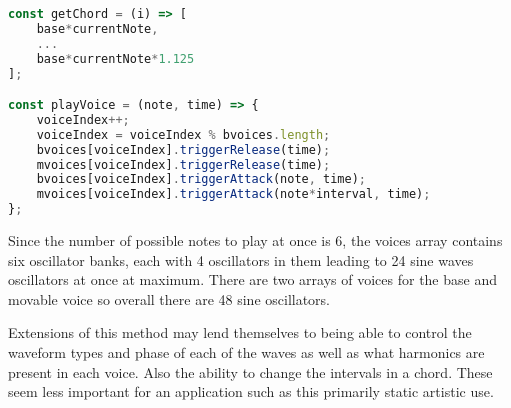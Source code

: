 \begin{lstlisting}[language=JavaScript]
const getChord = (i) => [
    base*currentNote,
    ...
    base*currentNote*1.125
];

const playVoice = (note, time) => {
    voiceIndex++;
    voiceIndex = voiceIndex % bvoices.length;
    bvoices[voiceIndex].triggerRelease(time);
    mvoices[voiceIndex].triggerRelease(time);
    bvoices[voiceIndex].triggerAttack(note, time);
    mvoices[voiceIndex].triggerAttack(note*interval, time);
};
\end{lstlisting}

Since the number of possible notes to play at once is 6, the voices array
contains six oscillator banks, each with 4 oscillators in them leading to 24
sine waves oscillators at once at maximum. There are two arrays of voices for
the base and movable voice so overall there are 48 sine oscillators.

Extensions of this method may lend themselves to being able to control the
waveform types and phase of each of the waves as well as what harmonics are
present in each voice. Also the ability to change the intervals in a chord.
These seem less important for an application such as this primarily static
artistic use.
